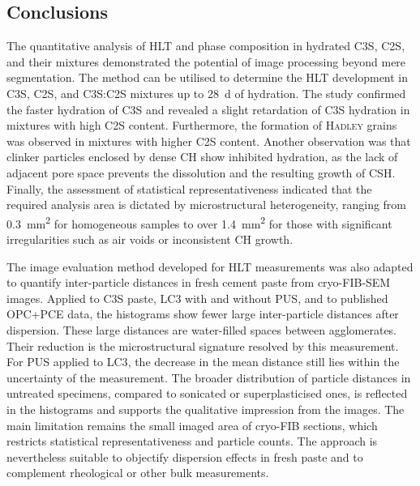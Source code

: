 \subsection{Conclusions}

The quantitative analysis of \ac{HLT} and phase composition in hydrated \ac{C3S}, \ac{C2S}, and their mixtures demonstrated the potential of image processing beyond mere segmentation.
The method can be utilised to determine the \ac{HLT} development in \ac{C3S}, \ac{C2S}, and \ac{C3S}:\ac{C2S} mixtures up to \qty{28}{\day} of hydration.
The study confirmed the faster hydration of \ac{C3S} and revealed a slight retardation of \ac{C3S} hydration in mixtures with high \ac{C2S} content.
Furthermore, the formation of \textsc{Hadley} grains was observed in mixtures with higher \ac{C2S} content.
Another observation was that clinker particles enclosed by dense \ac{CH} show inhibited hydration, as the lack of adjacent pore space prevents the dissolution and the resulting growth of \ac{CSH}.
Finally, the assessment of statistical representativeness indicated that the required analysis area is dictated by microstructural heterogeneity, ranging from \qty{0.3}{\milli\meter\squared} for homogeneous samples to over \qty{1.4}{\milli\meter\squared} for those with significant irregularities such as air voids or inconsistent \ac{CH} growth.

The image evaluation method developed for \ac{HLT} measurements was also adapted to quantify inter-particle distances in fresh cement paste from cryo-\ac{FIB}-\ac{SEM} images.
Applied to \ac{C3S} paste, \ac{LC3} with and without \ac{PUS}, and to published \ac{OPC}+\ac{PCE} data, the histograms show fewer large inter-particle distances after dispersion.
These large distances are water-filled spaces between agglomerates.
Their reduction is the microstructural signature resolved by this measurement.
For \ac{PUS} applied to \ac{LC3}, the decrease in the mean distance still lies within the uncertainty of the measurement.
The broader distribution of particle distances in untreated specimens, compared to sonicated or superplasticised ones, is reflected in the histograms and supports the qualitative impression from the images.
The main limitation remains the small imaged area of cryo-\ac{FIB} sections, which restricts statistical representativeness and particle counts. 
The approach is nevertheless suitable to objectify dispersion effects in fresh paste and to complement rheological or other bulk measurements.

